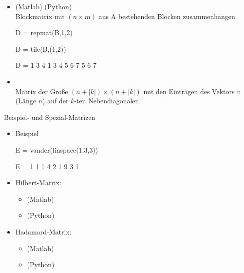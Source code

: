 \documentclass[hyperref={xetex}]{beamer}
\begin{document}
%
%
\begin{frame}[fragile]{}
\begin{itemize}
\item {}(Matlab) (Python)\\ Blockmatrix mit $(n \times m)$
  aus A bestehenden Blöcken zusammenhängen
\begin{matlabin}
D = repmat(B,1,2) 
\end{matlabin}
\begin{pyin}
D = tile(B,(1,2))
\end{pyin}
\begin{matlab}
D =
     1     3     4     1     3     4
     5     6     7     5     6     7 
\end{matlab}


\item {} \\Matrix der Größe $(n+|k|) \times
  (n+|k|)$ mit den Einträgen des Vektors $v$ (Länge $n$) auf der $k$-ten Nebendiagonalen. 
\end{itemize}
\end{frame}
%
%
\begin{frame}[fragile]{Beispiel- und Spezial-Matrizen}
\begin{itemize}
\item Beispiel
\begin{matlabin}
E = vander(linspace(1,3,3))
\end{matlabin}
\begin{matlab}
E =
     1     1     1
     4     2     1
     9     3     1
\end{matlab}

\item Hilbert-Matrix: 
  \begin{itemize}
    \item {}(Matlab) 
    \item {}(Python)
  \end{itemize}
\item Hadamard-Matrix:
  \begin{itemize}
    \item {} (Matlab) 
    \item {}(Python)
  \end{itemize}
\end{itemize}
\end{frame}
\end{document}
